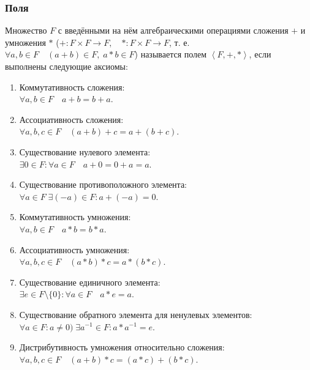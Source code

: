\documentclass[12pt]{matmex-diploma}
\begin{document}
        \subsubsection*{Поля}
            Множество $F$ с введёнными на нём алгебраическими операциями сложения $+$ и умножения $*$ ($+\colon F\times F\to F,\quad *\colon F\times F\to F$, т. е. $\forall a,b\in F\quad (a+b)\in F,\;a*b\in F$) называется полем $\left\langle F,+,*\right\rangle$, если выполнены следующие аксиомы:
            \begin{enumerate}
                \item Коммутативность сложения: \\$\forall a,b\in F\quad a+b=b+a$.
                \item Ассоциативность сложения: \\$\forall a,b,c\in F\quad (a+b)+c=a+(b+c)$.
                \item Существование нулевого элемента: \\$\exists{0}\in F\colon \forall a\in F\quad a+{0}={0}+a=a$.
                \item Существование противоположного элемента: \\$\forall a\in F\;\exists (-a)\in F\colon a+(-a)={0}$.
                \item Коммутативность умножения: \\$\forall a,b\in F\quad a*b=b*a$.
                \item Ассоциативность умножения: \\$\forall a,b,c\in F\quad (a*b)*c=a*(b*c)$.
                \item Существование единичного элемента: \\$\exists e\in F\setminus \{{0}\}\colon \forall a\in F\quad a*e=a$.
                \item Существование обратного элемента для ненулевых элементов: \\$\forall a\in F\colon a\neq {0})\;\exists a^{-1}\in F\colon a*a^{-1}=e$.
                \item Дистрибутивность умножения относительно сложения: \\$\forall a,b,c\in F\quad (a+b)*c=(a*c)+(b*c)$.
            \end{enumerate}            
            
\end{document}
